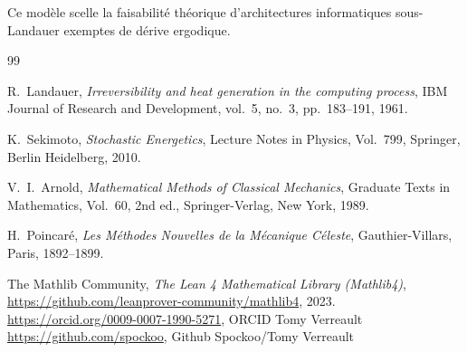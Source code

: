 \documentclass[10pt,twocolumn,a4paper]{article}
\begin{document}
Ce modèle scelle la faisabilité théorique d'architectures informatiques sous-Landauer exemptes de dérive ergodique.
\begin{thebibliography}{99}

R.~Landauer,
\emph{Irreversibility and heat generation in the computing process},
IBM Journal of Research and Development, vol.~5, no.~3, pp.~183--191, 1961.

K.~Sekimoto,
\emph{Stochastic Energetics},
Lecture Notes in Physics, Vol.~799, Springer, Berlin Heidelberg, 2010.

V.~I.~Arnold,
\emph{Mathematical Methods of Classical Mechanics},
Graduate Texts in Mathematics, Vol.~60, 2nd ed., Springer-Verlag, New York, 1989.

H.~Poincaré,
\emph{Les Méthodes Nouvelles de la Mécanique Céleste},
Gauthier-Villars, Paris, 1892--1899.

The Mathlib Community,
\emph{The Lean 4 Mathematical Library (Mathlib4)},
\url{https://github.com/leanprover-community/mathlib4}, 2023.
\url{https://orcid.org/0009-0007-1990-5271}, ORCID Tomy Verreault
\url{https://github.com/spockoo}, Github Spockoo/Tomy Verreault
\end{thebibliography}
\end{document}
